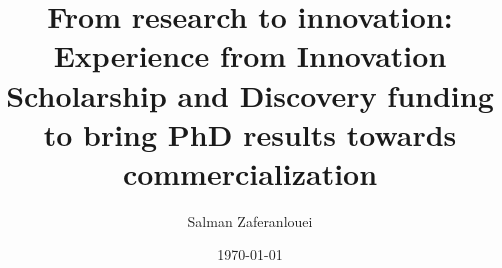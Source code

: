 \title[Research\\ $\downarrow$\\ {\tiny $Commercialization$}]{From research to innovation: Experience from Innovation Scholarship and Discovery funding to bring PhD results towards commercialization}




\author[]{Salman Zaferanlouei}
\date{\today}
